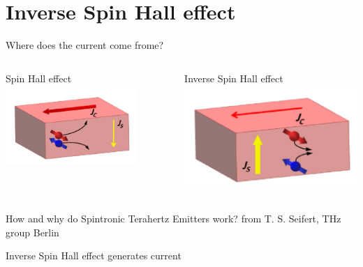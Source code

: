 \documentclass[aspectratio=1610, 9pt]{beamer}
\begin{document}


\section{Inverse Spin Hall effect}
\begin{frame}{Where does the current come frome?}
\begin{center}
\normalsize
\end{center}
\begin{columns}
  \begin{column}{0.5\textwidth}
  Spin Hall effect
  \includegraphics[width=0.8\textwidth]{pics/Spin_Hall.png}
  \end{column}
  \begin{column}{0.5\textwidth}
    Inverse Spin Hall effect
    \includegraphics[width=.8\textwidth]{pics/inv_spin_hall.png}
  \end{column}
\end{columns}
\vspace{.2in}
\small{\textcolor{tugreen}{How and why do Spintronic Terahertz Emitters work?} from T. S. Seifert, THz group Berlin}
\vspace{0.2in}
\begin{center}
  \Large Inverse Spin Hall effect generates current
\end{center}
\end{frame}
\end{document}
